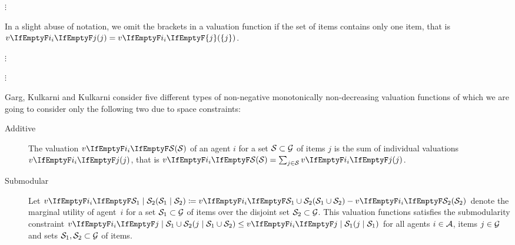 \(\vdots\)

In a slight abuse of notation, we omit the brackets in a valuation function if the set of items contains only one item, that is \(\valuations[j] = \valuations[\{j\}]\).

\(\vdots\)


\(\vdots\)

Garg, Kulkarni and Kulkarni consider five different types of non-negative monotonically non-decreasing valuation functions of which we are going to consider only the following two due to space constraints:
\begin{description}
	\item[Additive]
	The valuation \(\valuations[\genericset]\) of an agent \(i\) for a set \(\mathcal{S} \subset \mathcal{G}\) of items \(j\) is the sum of individual valuations \(\valuations[j]\), that is \(\valuations[\genericset] = \sum_{j \in \genericset} \valuations[j]\).

	\item[Submodular]
	Let \(\valuations[\genericset_1 \given \genericset_2] \coloneq \valuations[\genericset_1 \cup \genericset_2] - \valuations[\genericset_2]\) denote the marginal utility of agent~\(i\) for a set \(\mathcal{S}_1 \subset \mathcal{G}\) of items over the disjoint set \(\mathcal{S}_2 \subset \mathcal{G}\).
	This valuation functions satisfies the submodularity constraint \(\valuations[j \given \genericset_1 \cup \genericset_2] \leq \valuations[j \given \genericset_1]\) for all agents \(i \in \mathcal{A}\), items \(j \in \mathcal{G}\) and sets \(\mathcal{S}_1, \mathcal{S}_2 \subset \mathcal{G}\) of items.
\end{description}

\blindtext[4]